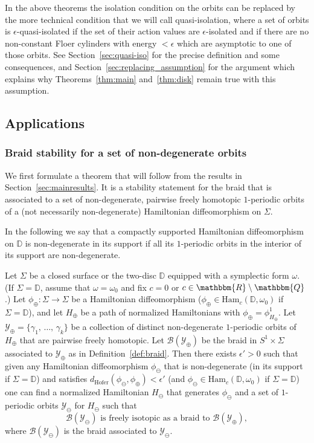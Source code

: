 \documentclass[AHL,Unicode,longabstracts,published]{cedram}
\newcommand{\Q}{\mathbbm{Q}}
\newcommand{\R}{\mathbbm{R}}
\newcommand{\D}{\mathbb{D}}
\newcommand{\Ham}{\mathrm{Ham}}
\newcommand{\hofer}{\mathrm{Hofer}}
\newcommand{\clY}{\mathcal{Y}}
\newcommand{\clB}{\mathcal{B}}
\newcommand{\hofer}{\mathrm{Hofer}}
\begin{document}
\begin{rema}\label{main_weaker_assumption}
In the above theorems the isolation condition on the orbits can be replaced by the more technical condition that we will call quasi-isolation, where a set of orbits is $\epsilon$-quasi-isolated if the set of their action values are $\epsilon$-isolated and if there are no non-constant Floer cylinders with energy $< \epsilon$ which are asymptotic to one of those orbits. See Section~\ref{sec:quasi-iso} for the precise definition and some consequences, and Section~\ref{sec:replacing_assumption} for the argument which explains why Theorems~\ref{thm:main} and~\ref{thm:disk} remain true with this assumption.
\end{rema}


\subsection{Applications}


\subsubsection{Braid stability for a set of non-degenerate orbits}

We first formulate a theorem that will follow from the results in Section~\ref{sec:mainresults}. It is a stability statement for the braid that is associated to a set of non-degenerate, pairwise freely homotopic $1$-periodic orbits of a (not necessarily non-degenerate) Hamiltonian diffeomorphism on $\Sigma$.

In the following we say that a compactly supported Hamiltonian diffeomorphism on $\D$ is non-degenerate in its support if all its $1$-periodic orbits in the interior of its support are non-degenerate.

\begin{theo}\label{thm:nondeg_stable}
Let $\Sigma$ be a closed surface or the two-disc $\D$ equipped with a symplectic form $\omega$. (If $\Sigma = \D$, assume that $\omega = \omega_0$ and fix $c=0$ or $c\in \R \setminus \Q$.) Let $\phi_{\oplus}:\Sigma \to \Sigma$ be a Hamiltonian diffeomorphism ($\phi_{\oplus}\in \Ham_c(\D,\omega_0)$ if $\Sigma = \D$), and let $H_{\oplus}$ be a path of normalized Hamiltonians with $\phi_{\oplus} = \phi^1_{H_{\oplus}}$. Let $\clY_{\oplus} = \{\gamma_1,\,\ldots,\,\gamma_k\}$ be a collection of distinct non-degenerate $1$-periodic orbits of $H_{\oplus}$ that are pairwise freely homotopic. Let $\clB(\clY_{\oplus})$ be the braid in $S^1 \times \Sigma$ associated to $\clY_{\oplus}$ as in Definition~\ref{def:braid}. Then there exists $\epsilon'>0$ such that given any Hamiltonian diffeomorphism $\phi_{\ominus}$ that is non-degenerate (in its support if $\Sigma = \D$) and satisfies $d_{\hofer}(\phi_\ominus, \phi_{\oplus}) < \epsilon'$ (and $\phi_{\ominus}\in \Ham_c(\D,\omega_0)$ if $\Sigma = \D$) one can find a normalized Hamiltonian $H_{\ominus}$ that generates $\phi_{\ominus}$ and a set of $1$-periodic orbits $\clY_{\ominus}$ for $H_{\ominus}$ such that
\[
\clB(\clY_{\ominus}) \text{ is freely isotopic as a braid to } \clB(\clY_{\oplus}),
\]
where $\clB(\clY_\ominus)$ is the braid associated to $\clY_\ominus$.
\end{theo}
\end{document}

